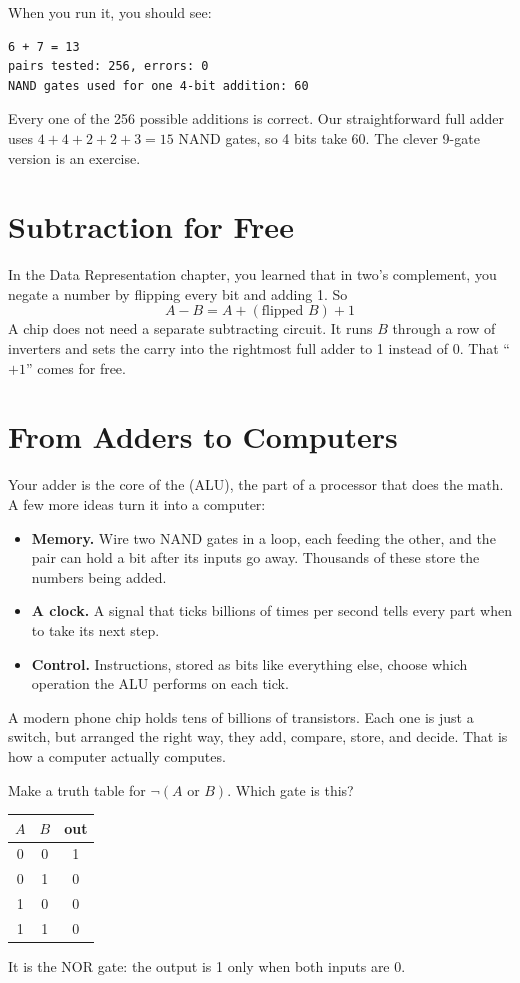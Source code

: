 When you run it, you should see:
\begin{verbatim}
6 + 7 = 13
pairs tested: 256, errors: 0
NAND gates used for one 4-bit addition: 60
\end{verbatim}

Every one of the 256 possible additions is correct. Our straightforward full adder uses
$4 + 4 + 2 + 2 + 3 = 15$ NAND gates, so 4 bits take 60. The clever 9-gate version is an exercise.

\section{Subtraction for Free}
In the Data Representation chapter, you learned that in two's complement, you negate a number by
flipping every bit and adding 1. So
$$A - B = A + (\text{flipped } B) + 1$$
A chip does not need a separate subtracting circuit. It runs $B$ through a row of inverters and sets the
carry into the rightmost full adder to 1 instead of 0. That ``$+1$'' comes for free.

\section{From Adders to Computers}
Your adder is the core of the  (ALU), the part
of a processor that does the math. A few more ideas turn it into a computer:
\begin{itemize}
\item \textbf{Memory.} Wire two NAND gates in a loop, each feeding the other, and the pair can hold a
bit after its inputs go away. Thousands of these store the numbers being added.
\item \textbf{A clock.} A signal that ticks billions of times per second tells every part when to
take its next step.
\item \textbf{Control.} Instructions, stored as bits like everything else, choose which operation the
ALU performs on each tick.
\end{itemize}

A modern phone chip holds tens of billions of transistors. Each one is just a switch, but arranged
the right way, they add, compare, store, and decide. That is how a computer actually computes.

\begin{Exercise}[title={NOR Truth Table}, label=dl_nor]
Make a truth table for $\neg(A \text{ or } B)$. Which gate is this?
\end{Exercise}
\begin{Answer}[ref=dl_nor]
\begin{tabular}{c c | c}
$A$ & $B$ & out \\
\hline
0 & 0 & 1 \\
0 & 1 & 0 \\
1 & 0 & 0 \\
1 & 1 & 0 \\
\end{tabular}

It is the NOR gate: the output is 1 only when both inputs are 0.
\end{Answer}

